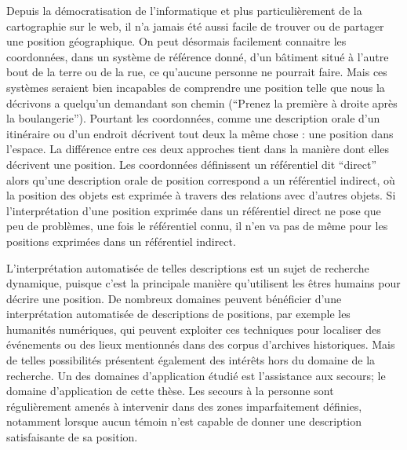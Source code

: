 
Depuis la démocratisation de l'informatique et plus particulièrement
de la cartographie sur le web, il n'a jamais été aussi facile de
trouver ou de partager une position géographique. On peut désormais
facilement connaitre les coordonnées, dans un système de référence
donné, d'un bâtiment situé à l'autre bout de la terre ou de la rue, ce
qu'aucune personne ne pourrait faire. Mais ces systèmes seraient bien
incapables de comprendre une position telle que nous la décrivons a
quelqu’un demandant son chemin (\eg \enquote{Prenez la première à
  droite après la boulangerie}). Pourtant les coordonnées, comme une
description orale d'un itinéraire ou d'un endroit décrivent tout deux
la même chose : une position dans l'espace. La différence entre ces
deux approches tient dans la manière dont elles décrivent une
position. Les coordonnées définissent un référentiel dit
\enquote{direct} alors qu'une description orale de position correspond
a un référentiel indirect, où la position des objets est exprimée à
travers des relations avec d'autres objets. Si l’interprétation d'une
position exprimée dans un référentiel direct ne pose que peu de
problèmes, une fois le référentiel connu, il n'en va pas de même pour
les positions exprimées dans un référentiel indirect.

L'interprétation automatisée de telles descriptions est un sujet de
recherche dynamique, puisque c'est la principale manière qu'utilisent
les êtres humains pour décrire une position. De nombreux domaines
peuvent bénéficier d'une interprétation automatisée de descriptions de
positions, par exemple les humanités numériques, qui peuvent exploiter
ces techniques pour localiser des événements ou des lieux mentionnés
dans des corpus d'archives historiques. Mais de telles possibilités
présentent également des intérêts hors du domaine de la recherche. Un
des domaines d’application étudié est l'assistance aux secours; le
domaine d’application de cette thèse. Les secours à la personne sont
régulièrement amenés à intervenir dans des zones imparfaitement
définies, notamment lorsque aucun témoin n'est capable de donner une
description satisfaisante de sa position.








